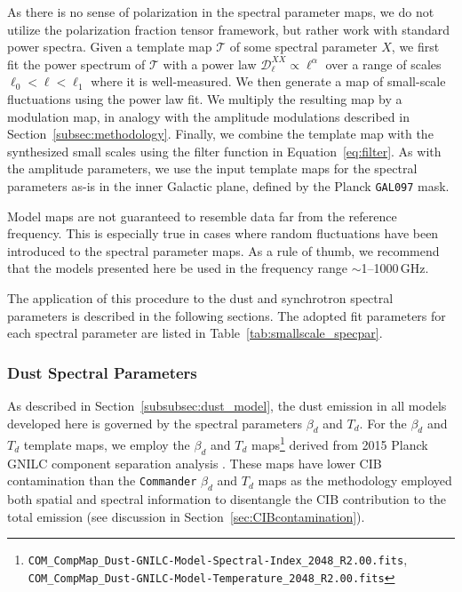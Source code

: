 \documentclass[twocolumn]{aastex631}
\begin{document}
As there is no sense of polarization in the spectral parameter maps, we do not utilize the polarization fraction tensor framework, but rather work with standard power spectra. Given a template map $\mathcal{T}$ of some spectral parameter $X$, we first fit the power spectrum of $\mathcal{T}$ with a power law $\mathcal{D}_\ell^{XX} \propto \ell^\alpha$ over a range of scales $\ell_0 < \ell < \ell_1$ where it is well-measured. We then generate a map of small-scale fluctuations using the power law fit. We multiply the resulting map by a modulation map, in analogy with the amplitude modulations described in Section~\ref{subsec:methodology}. Finally, we combine the template map with the synthesized small scales using the filter function in Equation~\ref{eq:filter}. As with the amplitude parameters, we use the input template maps for the spectral parameters as-is in the inner Galactic plane, defined by the Planck \texttt{GAL097} mask.

Model maps are not guaranteed to resemble data far from the reference frequency. This is especially true in cases where random fluctuations have been introduced to the spectral parameter maps. As a rule of thumb, we recommend that the models presented here be used in the frequency range $\sim$1--1000\,GHz.

The application of this procedure to the dust and synchrotron spectral parameters is described in the following sections. The adopted fit parameters for each spectral parameter are listed in Table~\ref{tab:smallscale_specpar}.

\subsubsection{Dust Spectral Parameters}\label{subsec:dust_spec_params}
As described in Section~\ref{subsubsec:dust_model}, the dust emission in all models developed here is governed by the spectral parameters $\beta_d$ and $T_d$. For the $\beta_d$ and $T_d$ template maps, we employ the $\beta_d$ and $T_d$ maps\footnote{\texttt{COM\_CompMap\_Dust-GNILC-Model-Spectral-Index\_2048\_R2.00.fits}, \texttt{COM\_CompMap\_Dust-GNILC-Model-Temperature\_2048\_R2.00.fits}} derived from 2015 Planck GNILC component separation analysis \citep{planck2016-XLVIII}. These maps have lower CIB contamination than the \texttt{Commander} $\beta_d$ and $T_d$ maps \citep{planck2014-a12} as the methodology employed both spatial and spectral information to disentangle the CIB contribution to the total emission (see discussion in Section~\ref{sec:CIBcontamination}).
\end{document}
